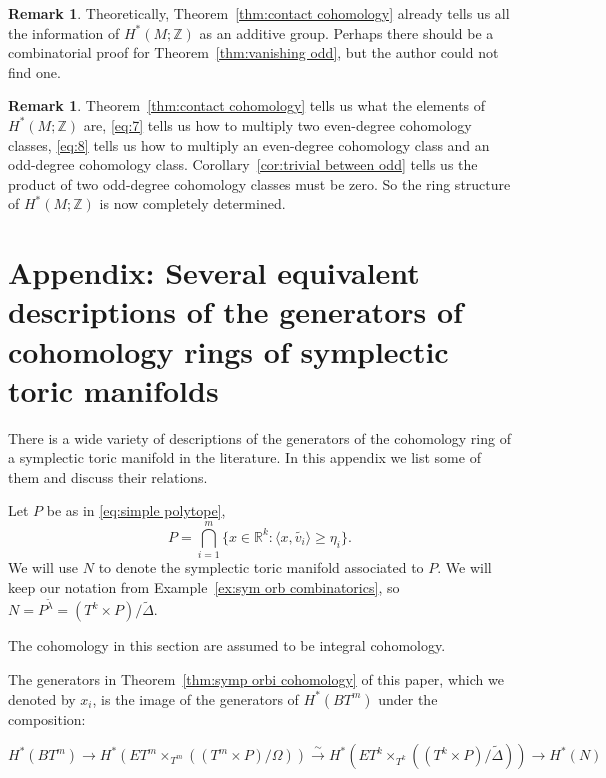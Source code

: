 \documentclass[12pt]{amsart}
\theoremstyle{definition}
\newtheorem{remark}[theorem]{Remark}
\numberwithin{equation}{section}
\begin{document}
\begin{remark}
Theoretically, Theorem~\ref{thm:contact cohomology} already tells us
all the information of $H^{*}(M;{{\mathbb{Z}}})$ as an additive group. Perhaps
there should be a combinatorial proof for Theorem~\ref{thm:vanishing
odd}, but the author could not find one.
\end{remark}

\begin{remark}
Theorem~\ref{thm:contact cohomology} tells us what the elements of
$H^{*}(M;{{\mathbb{Z}}})$ are, \eqref{eq:7} tells us how to multiply two
even-degree cohomology classes, \eqref{eq:8} tells us how to
multiply an even-degree cohomology class and an odd-degree
cohomology class. Corollary~\ref{cor:trivial between odd} tells us
the product of two odd-degree cohomology classes must be zero. So
the ring structure of $H^{*}(M;{{\mathbb{Z}}})$ is now completely determined.
\end{remark}

\section{\bf Appendix: Several equivalent descriptions of the
generators of cohomology rings of symplectic toric
manifolds}\label{sec:comparison}

There is a wide variety of descriptions of the generators of the
cohomology ring of a symplectic toric manifold in the literature. In
this appendix we list some of them and discuss their relations.

Let $P$ be as in \eqref{eq:simple polytope},
\begin{equation}
P=\bigcap_{i=1}^{m}\{x\in {{\mathbb{R}}}^k: \langle x, \tilde{v_{i}}\rangle \geq
\eta_{i}\}.
\end{equation}
We will use $N$ to denote the symplectic toric manifold associated
to $P$. We will keep our notation from Example~\ref{ex:sym orb
combinatorics}, so $N= P^{\tilde{\lambda}}= (T^k\times
P)/\tilde{\Delta}$.

The cohomology in this section are assumed to be integral
cohomology.

 The generators in Theorem~\ref{thm:symp orbi cohomology}
of this paper, which we denoted by $x_{i}$, is the image of the
generators of $H^{*}(BT^m)$ under the composition:

{\small \begin{equation}H^{*}(BT^m)\rightarrow
H^{*}(ET^m\times_{T^m}((T^m\times
P)/\Omega))\stackrel{\sim}{\rightarrow}H^{*}(ET^k\times_{T^k}((T^k\times
P)/\tilde{\Delta}))\rightarrow H^{*}(N)
\end{equation}}
\end{document}
